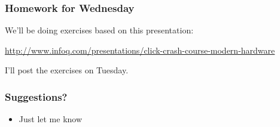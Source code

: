 \documentclass[aspectratio=43]{beamer}
\newenvironment{changemargin}[1]{%
  \begin{list}{}{%
    \setlength{\topsep}{0pt}%
    \setlength{\leftmargin}{#1}%
    \setlength{\rightmargin}{1em}
    \setlength{\listparindent}{\parindent}%
    \setlength{\itemindent}{\parindent}%
    \setlength{\parsep}{\parskip}%
  }%
  \item[]}{\end{list}}
\begin{document}
\begin{frame}
  \frametitle{Homework for Wednesday}

  \begin{changemargin}{2cm}
    We'll be doing exercises based on this presentation:
  \end{changemargin}
  \begin{center}
    \url{http://www.infoq.com/presentations/click-crash-course-modern-hardware}
  \end{center}
  \begin{changemargin}{2cm}
    I'll post the exercises on Tuesday.
  \end{changemargin}
\end{frame}


\begin{frame}
  \frametitle{Suggestions?}

  \begin{itemize}
    \item Just let me know
  \end{itemize}
\end{frame}
\end{document}
